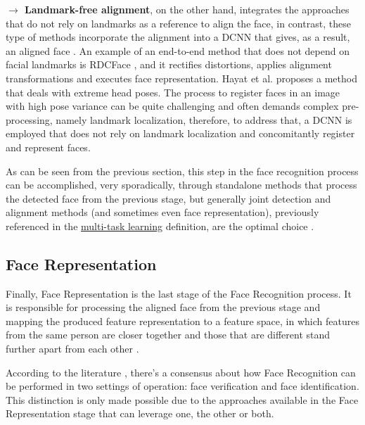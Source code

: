 \documentclass[class=report, crop=false, a4paper, 12pt]{standalone}
\begin{document}
\vspace{0.7\baselineskip}
\noindent\textbf{$\rightarrow$ Landmark-free alignment}, on the other hand, integrates the approaches that do not rely on landmarks as a reference to align the face, in contrast, these type of methods incorporate the alignment into a DCNN that gives, as a result, an aligned face \autocite{duElementsEndtoendDeep2022}. An example of an end-to-end method that does not depend on facial landmarks is RDCFace \autocite{zhaoRDCFaceRadialDistortion2020}, and it rectifies distortions, applies alignment transformations and executes face representation. Hayat et al. \autocite{hayatJointRegistrationRepresentation2017} proposes a method that deals with extreme head poses. The process to register faces in an image with high pose variance can be quite challenging and often demands complex pre-processing, namely landmark localization, therefore, to address that, a DCNN is employed that does not rely on landmark localization and concomitantly register and represent faces.


\vspace{0.7\baselineskip}
\par As can be seen from the previous section, this step in the face recognition process can be accomplished, very sporadically, through standalone methods that process the detected face from the previous stage, but generally joint detection and alignment methods (and sometimes even face representation), previously referenced in the \hyperref[mt learning]{multi-task learning} definition, are the optimal choice \autocite{changFacePoseNetMakingCase2017}.

\subsection{Face Representation}
\par Finally, Face Representation is the last stage of the Face Recognition process. It is responsible for processing the aligned face from the previous stage and mapping the produced feature representation to a feature space, in which features from the same person are closer together and those that are different stand further apart from each other \autocite{duElementsEndtoendDeep2022}.
\par According to the literature \autocite{duElementsEndtoendDeep2022,liHandbookFaceRecognition2011,ranjanDeepLearningUnderstanding2018,schroffFaceNetUnifiedEmbedding2015,wangDeepFaceRecognition2021}, there's a consensus about how Face Recognition can be performed in two settings of operation: face verification and face identification. This distinction is only made possible due to the approaches available in the Face Representation stage that can leverage one, the other or both. 
\end{document}
